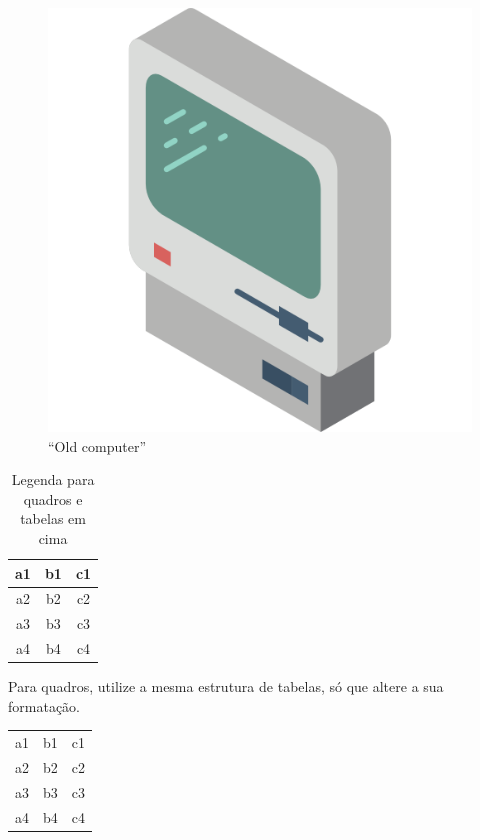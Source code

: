 \begin{figure}[htb]
	\centering
    \includegraphics[scale=0.20]{assets/072-old-computer} %
	\caption{``Old computer''} 
\end{figure}

\begin{table}[htb]
\caption{Legenda para quadros e tabelas em cima}
\begin{tabular}{|c|c|c|}
\hline
a1 & b1 & c1 \\ \hline
a2 & b2 & c2 \\ \hline
a3 & b3 & c3 \\ \hline
a4 & b4 & c4 \\ \hline
\end{tabular}
\end{table}

Para quadros, utilize a mesma estrutura de tabelas, só que altere a sua formatação.
\begin{quadro}[htb]
\caption{\label{quadro_modelo}Legenda do quadro}
\begin{tabular}{ c c c }
a1 & b1 & c1 \\ 
a2 & b2 & c2 \\ 
a3 & b3 & c3 \\ 
a4 & b4 & c4 \\ 
\end{tabular}
\end{quadro}

